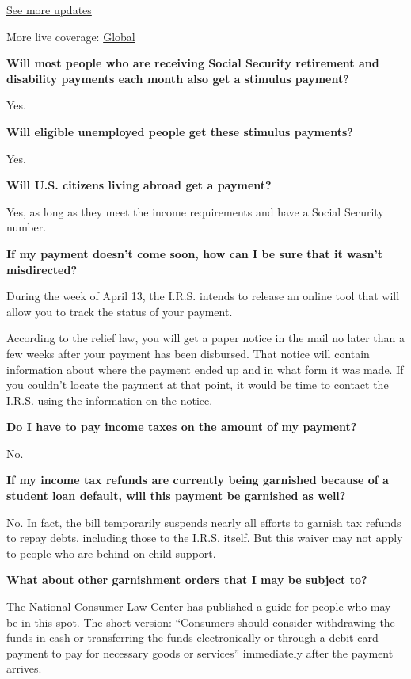 \href{https://www.nytimes.com/live/2020/07/31/business/stock-market-today-coronavirus?action=click\&pgtype=Article\&state=default\&region=MAIN_CONTENT_1\&context=storylines_live_updates}{See
more updates}

More live coverage:
\href{https://www.nytimes.com/2020/08/01/world/coronavirus-covid-19.html?action=click\&pgtype=Article\&state=default\&region=MAIN_CONTENT_1\&context=storylines_live_updates}{Global}

\textbf{Will most people who are receiving Social Security retirement
and disability payments each month also get a stimulus payment?}

Yes.

\textbf{Will eligible unemployed people get these stimulus payments?}

Yes.

\textbf{Will U.S. citizens living abroad get a payment?}

Yes, as long as they meet the income requirements and have a Social
Security number.

\textbf{If my payment doesn't come soon, how can I be sure that it
wasn't misdirected?}

During the week of April 13, the I.R.S. intends to release an online
tool that will allow you to track the status of your payment.

According to the relief law, you will get a paper notice in the mail no
later than a few weeks after your payment has been disbursed. That
notice will contain information about where the payment ended up and in
what form it was made. If you couldn't locate the payment at that point,
it would be time to contact the I.R.S. using the information on the
notice.

\textbf{Do I have to pay income taxes on the amount of my payment?}

No.

\textbf{If my income tax refunds are currently being garnished because
of a student loan default, will this payment be garnished as well?}

No. In fact, the bill temporarily suspends nearly all efforts to garnish
tax refunds to repay debts, including those to the I.R.S. itself. But
this waiver may not apply to people who are behind on child support.

\textbf{What about other garnishment orders that I may be subject to?}

The National Consumer Law Center has published
\href{https://library.nclc.org/protecting-against-creditor-seizure-stimulus-checks}{a
guide} for people who may be in this spot. The short version:
``Consumers should consider withdrawing the funds in cash or
transferring the funds electronically or through a debit card payment to
pay for necessary goods or services'' immediately after the payment
arrives.

